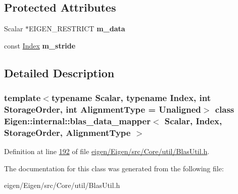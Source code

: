 \subsection*{Protected Attributes}
\begin{DoxyCompactItemize}
\item 
\mbox{\label{class_eigen_1_1internal_1_1blas__data__mapper_aed018fad160ea8ad698c7f7eba954707}} 
Scalar $\ast$E\+I\+G\+E\+N\+\_\+\+R\+E\+S\+T\+R\+I\+CT {\bfseries m\+\_\+data}
\item 
\mbox{\label{class_eigen_1_1internal_1_1blas__data__mapper_a9547e7778e522ac1c4276a8dd04a959f}} 
const \hyperlink{namespace_eigen_a62e77e0933482dafde8fe197d9a2cfde}{Index} {\bfseries m\+\_\+stride}
\end{DoxyCompactItemize}


\subsection{Detailed Description}
\subsubsection*{template$<$typename Scalar, typename Index, int Storage\+Order, int Alignment\+Type = Unaligned$>$\newline
class Eigen\+::internal\+::blas\+\_\+data\+\_\+mapper$<$ Scalar, Index, Storage\+Order, Alignment\+Type $>$}



Definition at line \hyperlink{eigen_2_eigen_2src_2_core_2util_2_blas_util_8h_source_l00192}{192} of file \hyperlink{eigen_2_eigen_2src_2_core_2util_2_blas_util_8h_source}{eigen/\+Eigen/src/\+Core/util/\+Blas\+Util.\+h}.



The documentation for this class was generated from the following file\+:\begin{DoxyCompactItemize}
\item 
eigen/\+Eigen/src/\+Core/util/\+Blas\+Util.\+h\end{DoxyCompactItemize}
